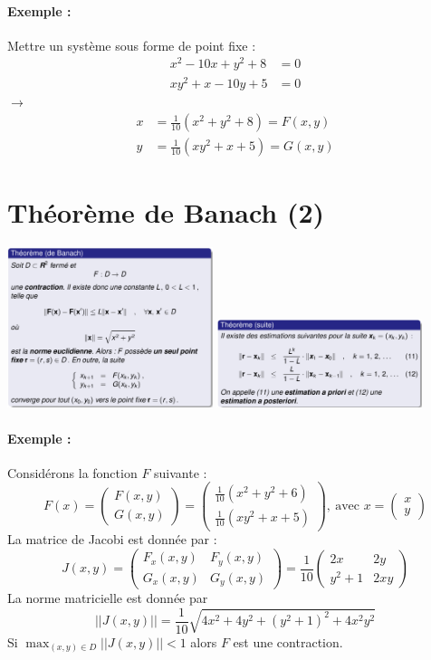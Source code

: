 \documentclass[a4paper,9pt]{extarticle}
\newcommand{\matd}[4]{\begin{pmatrix}#1 & #2 \\ #3 & #4\end{pmatrix}}
\newcommand{\matdd}[2]{\begin{pmatrix}#1 \\ #2\end{pmatrix}}
\begin{document}
\begin{multicols*}{2}
\paragraph*{Exemple :} Mettre un système sous forme de point fixe :
\begin{align*}
x^2-10x+y^2+8&=0\\
xy^2+x-10y+5&=0
\end{align*}
$\longrightarrow$
\begin{align*}
x &= \frac{1}{10}(x^2+y^2+8)=F(x,y)\\
y &= \frac{1}{10}(xy^2+x+5)=G(x,y)
\end{align*}

\section{Théorème de Banach (2)}

\begin{center}
    \includegraphics[width=0.45\textwidth]{img/banach_2.png}
    \includegraphics[width=0.45\textwidth]{img/banach_2_2.png}
\end{center}


\paragraph*{Exemple :}

Considérons la fonction $F$ suivante :
$$
F(x)= \matdd{F(x,y)}{G(x,y)} = \matdd{\frac{1}{10}(x^2+y^2+6)}{\frac{1}{10}(xy^2+x+5)}, \ \text{avec } x=\matdd{x}{y}
$$
La matrice de Jacobi est donnée par :
$$
J(x,y)=\matd{F_x(x,y)}{F_y(x,y)}{G_x(x,y)}{G_y(x,y)} = \frac{1}{10}\matd{2x}{2y}{y^2+1}{2xy}
$$
La norme matricielle est donnée par
$$
||J(x,y)||=\frac{1}{10}\sqrt{4x^2+4y^2+(y^2+1)^2+4x^2y^2}
$$
Si $\max_{(x,y)\in D}||J(x,y)||<1$ alors $F$ est une contraction.


\end{multicols*}
\end{document}
